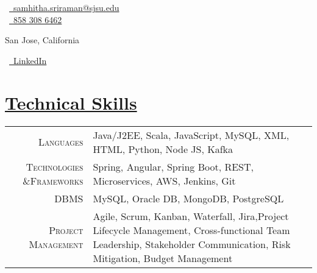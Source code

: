 \documentclass[a4paper,11pt]{extarticle} %
\begin{document}
\pagestyle{empty} %

\begin{multicols}{3}

\normalsize  \faEnvelope\ {\href{samhitha.sriraman@sjsu.edu }{\  samhitha.sriraman@sjsu.edu}}\\
\normalsize \faPhone\ {\href{}{\  858 308 6462}}\\
\columnbreak
\normalsize\par{\centering{\huge\textsc{\textcolor{primary}{Samhitha Sriraman }}}\par} 
\par{\centering\normalsize {San Jose, California}\hfill\par}
\columnbreak
\raggedright\hfill\normalsize \faLinkedinSquare\ {\href{https://www.linkedin.com/in/samhithasrirama/}{\  LinkedIn}}\\
\end{multicols}
\vspace{-0.4 cm}
 \vspace{+0.4cm} \section{\textcolor{primary}{\href{https://www.github.com/proffapt/bodhitree}{Technical Skills}}}

 \vspace{+0.2cm}

 \begin{tabular}{r|p{15cm}}
 \textsc{Languages} & Java/J2EE, Scala, JavaScript, MySQL, XML, HTML, Python, Node JS, Kafka\\
 \textsc{Technologies \&Frameworks}& Spring, Angular, Spring Boot, REST, Microservices, AWS, Jenkins, Git\\
 \textsc{DBMS} &  MySQL, Oracle DB, MongoDB, PostgreSQL\\
 \textsc{Project Management}& Agile, Scrum, Kanban, Waterfall, Jira,Project Lifecycle Management, Cross-functional Team Leadership, Stakeholder
Communication, Risk Mitigation, Budget Management\\
 
\end{tabular}
\end{document}
